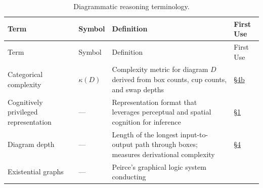\documentclass[
]{article}
\begin{document}
\begin{longtable}[]{@{}
  >{\raggedright\arraybackslash}p{}
  >{\centering\arraybackslash}p{}
  >{\raggedright\arraybackslash}p{}
  >{\centering\arraybackslash}p{}@{}}
\caption{Diagrammatic reasoning
terminology.}\label{tbl:not-diagrammatic}\tabularnewline
\toprule\noalign{}
\begin{minipage}[b]{\linewidth}\raggedright
Term
\end{minipage} & \begin{minipage}[b]{\linewidth}\centering
Symbol
\end{minipage} & \begin{minipage}[b]{\linewidth}\raggedright
Definition
\end{minipage} & \begin{minipage}[b]{\linewidth}\centering
First Use
\end{minipage} \\
\midrule\noalign{}
\endfirsthead
\toprule\noalign{}
\begin{minipage}[b]{\linewidth}\raggedright
Term
\end{minipage} & \begin{minipage}[b]{\linewidth}\centering
Symbol
\end{minipage} & \begin{minipage}[b]{\linewidth}\raggedright
Definition
\end{minipage} & \begin{minipage}[b]{\linewidth}\centering
First Use
\end{minipage} \\
\midrule\noalign{}
\endhead
\bottomrule\noalign{}
\endlastfoot
Categorical complexity & \(\kappa(D)\) & Complexity metric for diagram
\(D\) derived from box counts, cup counts, and swap depths &
\href{04b_compact_closure_complexity.md\#sec:compact-closure-complexity}{§4b} \\
Cognitively privileged representation & --- & Representation format that
leverages perceptual and spatial cognition for inference &
\href{01_introduction.md\#sec:introduction}{§1} \\
Diagram depth & --- & Length of the longest input-to-output path through
boxes; measures derivational complexity &
\href{04_categorical_semantics.md\#sec:categorical-semantics}{§4} \\
Existential graphs & --- & Peirce's graphical logic system conducting

\end{longtable}
\end{document}
